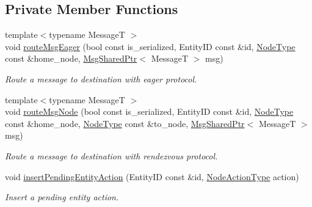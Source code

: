 \subsection*{Private Member Functions}
\begin{DoxyCompactItemize}
\item 
{\footnotesize template$<$typename MessageT $>$ }\\void \hyperlink{structvt_1_1location_1_1_entity_location_coord_a697b9b80d69caa89c8abfb0d7b075720}{route\+Msg\+Eager} (bool const is\+\_\+serialized, Entity\+ID const \&id, \hyperlink{namespacevt_a866da9d0efc19c0a1ce79e9e492f47e2}{Node\+Type} const \&home\+\_\+node, \hyperlink{namespacevt_ab2b3d506ec8e8d1540aede826d84a239}{Msg\+Shared\+Ptr}$<$ MessageT $>$ msg)
\begin{DoxyCompactList}\small\item\em Route a message to destination with eager protocol. \end{DoxyCompactList}\item 
{\footnotesize template$<$typename MessageT $>$ }\\void \hyperlink{structvt_1_1location_1_1_entity_location_coord_a2e325cea09f376da4be61cd540455618}{route\+Msg\+Node} (bool const is\+\_\+serialized, Entity\+ID const \&id, \hyperlink{namespacevt_a866da9d0efc19c0a1ce79e9e492f47e2}{Node\+Type} const \&home\+\_\+node, \hyperlink{namespacevt_a866da9d0efc19c0a1ce79e9e492f47e2}{Node\+Type} const \&to\+\_\+node, \hyperlink{namespacevt_ab2b3d506ec8e8d1540aede826d84a239}{Msg\+Shared\+Ptr}$<$ MessageT $>$ msg)
\begin{DoxyCompactList}\small\item\em Route a message to destination with rendezvous protocol. \end{DoxyCompactList}\item 
void \hyperlink{structvt_1_1location_1_1_entity_location_coord_a2b2c69634e3ef42e2625541cd234b350}{insert\+Pending\+Entity\+Action} (Entity\+ID const \&id, \hyperlink{namespacevt_1_1location_a3a9235e0ceb341bef225d2cc46606e9e}{Node\+Action\+Type} action)
\begin{DoxyCompactList}\small\item\em Insert a pending entity action. \end{DoxyCompactList}\end{DoxyCompactItemize}
